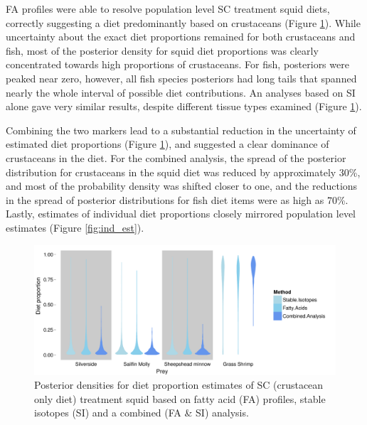 \documentclass[fleqn,10pt]{wlpeerj}
\begin{document}
FA profiles were able to resolve population level SC treatment squid diets, correctly
suggesting a diet predominantly based on crustaceans
(Figure \ref{fig:pop_comp}). While uncertainty about the exact diet
proportions remained for both crustaceans and fish, most of the
posterior density for squid diet proportions was clearly
concentrated towards high
proportions of crustaceans. For fish, posteriors were peaked near zero,
however, all fish species posteriors had long tails that spanned
nearly the whole interval of possible diet contributions. An analyses
based on SI alone gave very similar results, despite different tissue
types examined (Figure \ref{fig:pop_comp}). 

Combining the two markers lead to a substantial reduction in the
uncertainty of estimated diet proportions (Figure \ref{fig:pop_comp}),
and suggested a clear dominance of crustaceans in the diet. For the
combined analysis, the spread of the posterior distribution for crustaceans in the
squid diet was reduced by approximately 30\%, and most of the
probability density was shifted closer to one, and the reductions in
the spread of posterior distributions for fish diet items were as high
as 70\%. Lastly, estimates of individual diet proportions closely
mirrored population level estimates (Figure \ref{fig:ind_est}).

\begin{figure}
  \begin{center}
    \includegraphics[width=1\textwidth]{figures/Comp_plot_violin.pdf}
    \caption{Posterior densities for diet proportion estimates of SC (crustacean only diet)
      treatment squid based on fatty acid (FA) profiles, stable isotopes (SI) and a combined (FA \& SI) analysis.}
    \label{fig:pop_comp}
  \end{center}
\end{figure}
\end{document}
